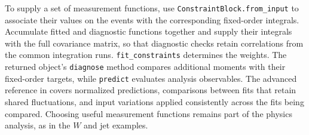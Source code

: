 To supply a set of measurement functions, use \texttt{ConstraintBlock.from\_input} to associate their values on the events with the corresponding fixed-order integrals. Accumulate fitted and diagnostic functions together and supply their integrals with the full covariance matrix, so that diagnostic checks retain correlations from the common integration runs. \texttt{fit\_constraints} determines the weights. The returned object's \texttt{diagnose} method compares additional moments with their fixed-order targets, while \texttt{predict} evaluates analysis observables. The advanced reference in  covers normalized predictions, comparisons between fits that retain shared fluctuations, and input variations applied consistently across the fits being compared. Choosing useful measurement functions remains part of the physics analysis, as in the $W$ and jet examples.
